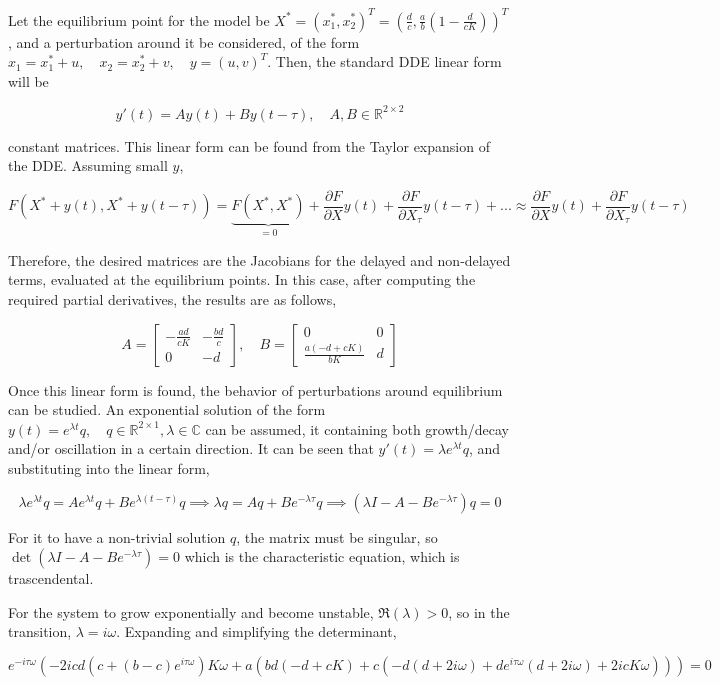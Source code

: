 \documentclass[11pt,oneside,parskip=half]{scrbook}  %
\begin{document}
Let the equilibrium point for the model be $X^*=(x_1^*, x_2^*)^T=(\frac dc,\frac ab(1-\frac d{cK}))^T$, and a perturbation around it be considered, of the form $x_1=x_1^*+u,\quad x_2=x_2^*+v,\quad y=(u,v)^T$. Then, the standard DDE linear form will be

$$
y'(t)=Ay(t)+By(t-\tau),\quad A,B\in\mathbb R^{2\times2}
$$

constant matrices. This linear form can be found from the Taylor expansion of the DDE. Assuming small $y$,

$$
F(X^*+y(t),X^*+y(t-\tau))=\underbrace{F(X^*,X^*)}_{=0}+\frac{\partial F}{\partial X}y(t)+\frac{\partial F}{\partial X_\tau}y(t-\tau)+...\approx \frac{\partial F}{\partial X}y(t)+\frac{\partial F}{\partial X_\tau}y(t-\tau)
$$

Therefore, the desired matrices are the Jacobians for the delayed and non-delayed terms, evaluated at the equilibrium points. In this case, after computing the required partial derivatives, the results are as follows,

$$
A=\begin{bmatrix} -\frac{ad}{cK}& -\frac{bd}c\\ 0& -d\end{bmatrix},\quad B=\begin{bmatrix}0&0\\\frac{a(-d+cK)}{bK}&d\end{bmatrix}
$$

Once this linear form is found, the behavior of perturbations around equilibrium can be studied. An exponential solution of the form $y(t)=e^{\lambda t}q,\quad q\in\mathbb R^{2\times 1},\lambda\in\mathbb C$ can be assumed, it containing both growth/decay and/or oscillation in a certain direction. It can be seen that $y'(t)=\lambda e^{\lambda t}q$, and substituting into the linear form,

$$
\lambda e^{\lambda t}q= A e^{\lambda t}q+Be^{\lambda(t-\tau)}q\implies\lambda q=Aq+Be^{-\lambda \tau}q\implies (\lambda I-A-Be^{-\lambda \tau})q=0
$$

For it to have a non-trivial solution $q$, the matrix must be singular, so $\det(\lambda I-A-Be^{-\lambda \tau})=0$ which is the characteristic equation, which is trascendental.

For the system to grow exponentially and become unstable, $\Re(\lambda)>0$, so in the transition, $\lambda=i\omega$. Expanding and simplifying the determinant,

$$
e^{-i\tau\omega} (-2icd(c+(b-c)e^{i\tau\omega})K\omega
+ a(bd(-d+cK) + c(-d(d+2i\omega) + de^{i\tau\omega}(d+2i\omega) + 2icK\omega
)))=0
$$
\end{document}
